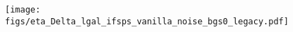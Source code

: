 \begin{figure}
\begin{center}
    \texttt{[image: figs/eta\_Delta\_lgal\_ifsps\_vanilla\_noise\_bgs0\_legacy.pdf]}
    \caption{} 
    \label{fig:systematics}
\end{center}
\end{figure}




